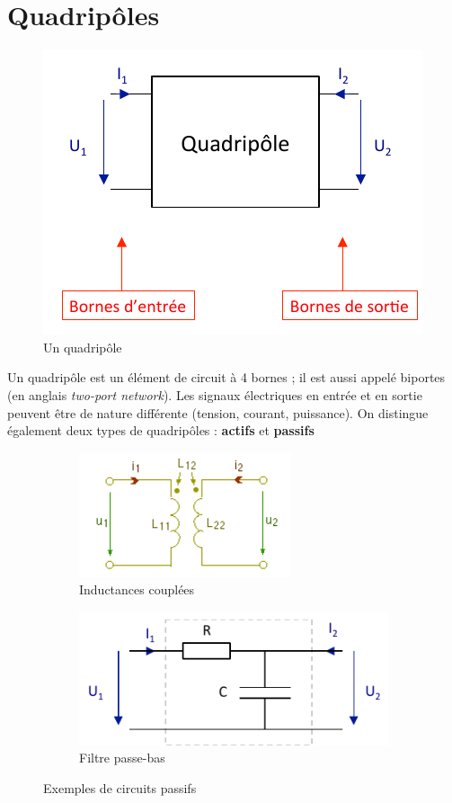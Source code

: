 \documentclass[12pt,a4paper]{article}
\begin{document}
\section{Quadripôles}
\setcounter{equation}{0}
\begin{figure}
	\centering
	\includegraphics[scale=0.5]{images/quadripole}
	\caption{Un quadripôle}
\end{figure}
Un quadripôle est un élément de circuit à 4 bornes ; il est aussi appelé biportes (en anglais \textit{two-port network}). Les signaux électriques en entrée et en sortie peuvent être de nature différente (tension, courant, puissance). On distingue également deux types de quadripôles : \textbf{actifs} et \textbf{passifs}
\begin{figure}
	\centering
	\begin{subfigure}[b]{0.45\textwidth}
		\centering
		\includegraphics[scale=0.7]{images/inductance_couplee}
		\caption{Inductances couplées}
	\end{subfigure}
	\begin{subfigure}[b]{0.45\textwidth}
		\centering
		\includegraphics[scale=0.6]{images/filtre_passe_bas}
		\caption{Filtre passe-bas}
	\end{subfigure}
	\caption{Exemples de circuits passifs}
\end{figure}
\end{document}
